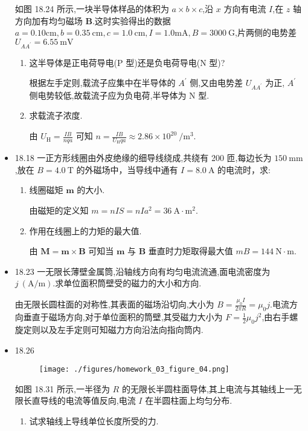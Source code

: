\begin{itemize}
            如图 18.24 所示,一块半导体样品的体积为 $a \times b \times c$,沿 $x$ 方向有电流 $I$,在 $z$ 轴方向加有均匀磁场 $\bm{B}$.这时实验得出的数据$a=0.10\mathrm{cm},b=0.35\ \mathrm{cm},c=1.0\ \mathrm{cm},I=1.0\mathrm{mA},B=3000\ \mathrm{G}$,片两侧的电势差 $U_{AA^{'}}= 6.55\ \mathrm{mV}$
            \begin{enumerate}
                \item 这半导体是正电荷导电(P 型)还是负电荷导电(N 型)?

                    根据左手定则,载流子应集中在半导体的 $A^{'}$ 侧,又由电势差 $U_{AA^{'}}$ 为正, $A^{'}$ 侧电势较低,故载流子应为负电荷,半导体为 N 型.
                \item 求载流子浓度.

                    由 $U_{\mathrm{H}}=\frac{IB}{nqa}$ 可知 $n=\frac{IB}{U_{\mathrm{H}}qa}\approx 2.86\times 10^{20}\ \mathrm{/ m^3}$.
            \end{enumerate}
        \item 18.18 一正方形线圈由外皮绝缘的细导线绕成,共绕有 200 匝,每边长为 $150 \ \mathrm{mm}$,放在 $B = 4.0 \ \mathrm{T}$ 的外磁场中，当导线中通有 $I=8.0 \ \mathrm{A}$ 的电流时，求:
            \begin{enumerate}
                \item 线圈磁矩 $\bm{m}$ 的大小.

                    由磁矩的定义知 $m=nIS=nIa^2=36 \ \mathrm{A\cdot m^2}$.
                \item 作用在线圈上的力矩的最大值.

                    由 $\bm{M}=\bm{m}\times \bm{B}$ 可知当 $\bm{m}$ 与 $\bm{B}$ 垂直时力矩取得最大值 $mB=144 \ \mathrm{N\cdot m}$.
            \end{enumerate}
        \item 18.23 一无限长薄壁金属筒,沿轴线方向有均匀电流流通,面电流密度为 $j\ \mathrm{(A / m)}$.求单位面积筒壁受的磁力的大小和方向.

            由无限长圆柱面的对称性,其表面的磁场沿切向,大小为 $B=\frac{\mu_0I}{2\pi R}=\mu_0j$.电流方向垂直于磁场方向,对于单位面积的筒壁,其受磁力大小为 $F=\frac{1}{2}\mu_0j^2$,由右手螺旋定则以及左手定则可知磁力方向沿法向指向筒内.
        \item 18.26 
            \begin{figure}[htbp]
                \texttt{[image: ./figures/homework\_03\_figure\_04.png]}
            \end{figure}
            
            如图 18.31 所示,一半径为 $R$ 的无限长半圆柱面导体,其上电流与其轴线上一无限长直导线的电流等值反向,电流 $I$ 在半圆柱面上均匀分布.
            \begin{enumerate}
                \item 试求轴线上导线单位长度所受的力.


\end{enumerate}
\end{itemize}
